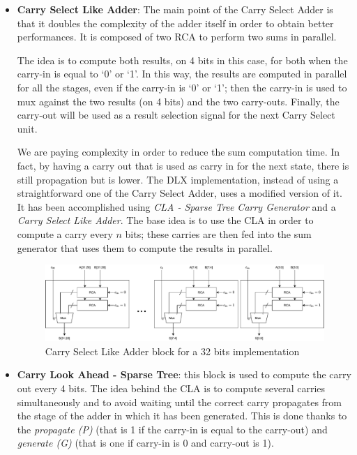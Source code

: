 \begin{itemize} 
    \item \textbf{Carry Select Like Adder}: The main point of the Carry Select Adder is that it doubles the complexity of the adder itself in order to obtain better performances. It is composed of two RCA to perform two sums in parallel.
    
    The idea is to compute both results, on 4 bits in this case, for both when the carry-in is equal to `0' or `1'. In this way, the results are computed in parallel for all the stages, even if the carry-in is `0' or `1'; then the carry-in is used to mux against the two results (on 4 bits) and the two carry-outs. Finally, the carry-out will be used as a result selection signal for the next Carry Select unit.
    
    We are paying complexity in order to reduce the sum computation time. In fact, by having a carry out that is used as carry in for the next state, there is still propagation but is lower.\newline\newline  
    The DLX implementation, instead of using a straightforward one of the Carry Select Adder, uses a modified version of it. It has been accomplished using \textit{CLA - Sparse Tree Carry Generator} and a \textit{Carry Select Like Adder}. The base idea is to use the CLA in order to compute a carry every $n$ bits; these carries are then fed into the sum generator that uses them to compute the results in parallel.
    \begin{figure}[H]
        \centering
        \includegraphics[width=1\textwidth]{chapters/5_ExecuteStage/images/carry_sum.pdf}
        \caption{Carry Select Like Adder block for a 32 bits implementation}
        \label{fig:carry_sum}
    \end{figure}
    \item \textbf{Carry Look Ahead - Sparse Tree}: this block is used to compute the carry out every 4 bits. The idea behind the CLA is to compute several carries simultaneously and to avoid waiting until the correct carry propagates from the stage of the adder in which it has been generated. This is done thanks to the \textit{propagate (P)} (that is 1 if the carry-in is equal to the carry-out) and \textit{generate (G)} (that is one if carry-in is 0 and carry-out is 1).

\end{itemize}
